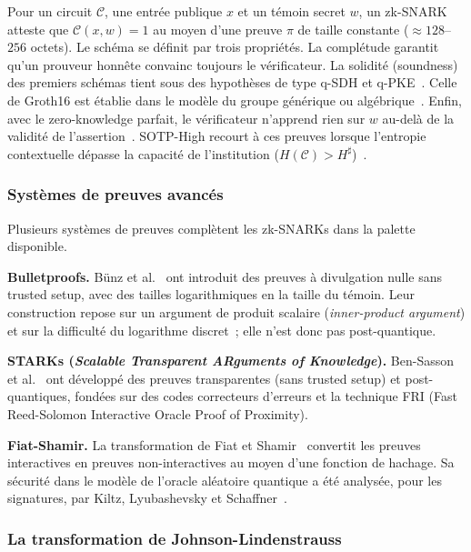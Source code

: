 \begin{sloppypar}
Pour un circuit $\mathcal{C}$, une entr\'ee publique $x$ et un t\'emoin secret $w$,
un zk-SNARK~\cite{Groth16,BCTV14,BenSasson2019} atteste que $\mathcal{C}(x, w)
= 1$ au moyen d'une preuve $\pi$ de taille constante ($\approx 128$--$256$ octets).
Le sch\'ema se d\'efinit par trois propri\'et\'es. La compl\'etude garantit qu'un prouveur
honn\^ete convainc toujours le v\'erificateur. La solidit\'e (soundness) des premiers sch\'emas tient sous des
hypoth\`eses de type q-SDH et q-PKE~\cite{Gennaro13,Parno13}. Celle de Groth16 est \'etablie dans le
mod\`ele du groupe g\'en\'erique ou alg\'ebrique~\cite{Groth16,FKL18}. Enfin, avec le
zero-knowledge parfait, le v\'erificateur
n'apprend rien sur $w$ au-del\`a de la validit\'e de l'assertion~\cite{GMR85}.
SOTP-High recourt \`a ces preuves lorsque l'entropie contextuelle d\'epasse la capacit\'e
de l'institution ($H(\mathcal{C}) > H^\sharp$)~\cite{PLONK20,Wahby18,Campanelli2019}.

\subsubsection{Syst\`emes de preuves avanc\'es}
\label{subsubsec:systemes_preuves}

Plusieurs syst\`emes de preuves compl\`etent les zk-SNARKs dans la palette disponible.

\textbf{Bulletproofs.} B\"unz et al.~\cite{Bunz19} ont introduit des preuves \`a divulgation nulle sans trusted setup, avec des tailles logarithmiques en la taille du t\'emoin. Leur construction repose sur un argument de produit scalaire (\emph{inner-product argument}) et sur la difficult\'e du logarithme discret~; elle n'est donc pas post-quantique.

\textbf{STARKs (\emph{Scalable Transparent ARguments of Knowledge}).} Ben-Sasson et al.~\cite{BenSasson2019} ont d\'evelopp\'e des preuves transparentes (sans trusted setup) et post-quantiques, fond\'ees sur des codes correcteurs d'erreurs et la technique FRI (Fast Reed-Solomon Interactive Oracle Proof of Proximity).

\textbf{Fiat-Shamir.} La transformation de Fiat et Shamir~\cite{FiatShamir87} convertit les preuves interactives en preuves non-interactives au moyen d'une fonction de hachage. Sa s\'ecurit\'e dans le mod\`ele de l'oracle al\'eatoire quantique a \'et\'e analys\'ee, pour les signatures, par Kiltz, Lyubashevsky et Schaffner~\cite{Kiltz2017}.

\subsubsection{La transformation de Johnson-Lindenstrauss}
\label{subsubsec:jl}


\end{sloppypar}
